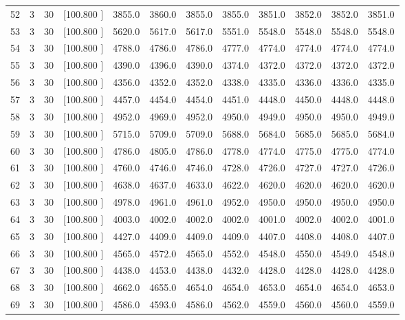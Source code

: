 \documentclass[12pt,a4paper]{article}
\begin{document}
\begin{center}
{\begin{tabular}{r r r r r r r r r r r r}
  52&  3& 30&[100.800   ]&  3855.0&  3860.0&  3855.0&  3855.0&  3851.0&  3852.0&  3852.0&  3851.0\\[-0.02in]
  53&  3& 30&[100.800   ]&  5620.0&  5617.0&  5617.0&  5551.0&  5548.0&  5548.0&  5548.0&  5548.0\\[-0.02in]
  54&  3& 30&[100.800   ]&  4788.0&  4786.0&  4786.0&  4777.0&  4774.0&  4774.0&  4774.0&  4774.0\\[-0.02in]
  55&  3& 30&[100.800   ]&  4390.0&  4396.0&  4390.0&  4374.0&  4372.0&  4372.0&  4372.0&  4372.0\\[-0.02in]
  56&  3& 30&[100.800   ]&  4356.0&  4352.0&  4352.0&  4338.0&  4335.0&  4336.0&  4336.0&  4335.0\\[-0.02in]
  57&  3& 30&[100.800   ]&  4457.0&  4454.0&  4454.0&  4451.0&  4448.0&  4450.0&  4448.0&  4448.0\\[-0.02in]
  58&  3& 30&[100.800   ]&  4952.0&  4969.0&  4952.0&  4950.0&  4949.0&  4950.0&  4950.0&  4949.0\\[-0.02in]
  59&  3& 30&[100.800   ]&  5715.0&  5709.0&  5709.0&  5688.0&  5684.0&  5685.0&  5685.0&  5684.0\\[-0.02in]
  60&  3& 30&[100.800   ]&  4786.0&  4805.0&  4786.0&  4778.0&  4774.0&  4775.0&  4775.0&  4774.0\\[-0.02in]
  61&  3& 30&[100.800   ]&  4760.0&  4746.0&  4746.0&  4728.0&  4726.0&  4727.0&  4727.0&  4726.0\\[-0.02in]
  62&  3& 30&[100.800   ]&  4638.0&  4637.0&  4633.0&  4622.0&  4620.0&  4620.0&  4620.0&  4620.0\\[-0.02in]
  63&  3& 30&[100.800   ]&  4978.0&  4961.0&  4961.0&  4952.0&  4950.0&  4950.0&  4950.0&  4950.0\\[-0.02in]
  64&  3& 30&[100.800   ]&  4003.0&  4002.0&  4002.0&  4002.0&  4001.0&  4002.0&  4002.0&  4001.0\\[-0.02in]
  65&  3& 30&[100.800   ]&  4427.0&  4409.0&  4409.0&  4409.0&  4407.0&  4408.0&  4408.0&  4407.0\\[-0.02in]
  66&  3& 30&[100.800   ]&  4565.0&  4572.0&  4565.0&  4552.0&  4548.0&  4550.0&  4549.0&  4548.0\\[-0.02in]
  67&  3& 30&[100.800   ]&  4438.0&  4453.0&  4438.0&  4432.0&  4428.0&  4428.0&  4428.0&  4428.0\\[-0.02in]
  68&  3& 30&[100.800   ]&  4662.0&  4655.0&  4654.0&  4654.0&  4653.0&  4654.0&  4654.0&  4653.0\\[-0.02in]
  69&  3& 30&[100.800   ]&  4586.0&  4593.0&  4586.0&  4562.0&  4559.0&  4560.0&  4560.0&  4559.0\\[-0.02in]

\end{tabular}}
\end{center}
\end{document}
